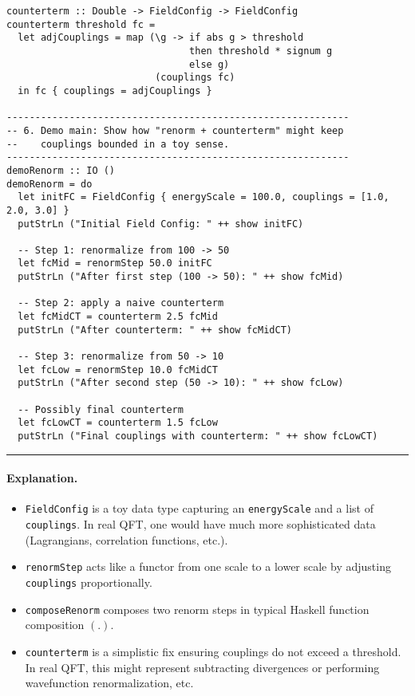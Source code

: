\documentclass[12pt]{article}
\begin{document}
\begin{verbatim}
counterterm :: Double -> FieldConfig -> FieldConfig
counterterm threshold fc =
  let adjCouplings = map (\g -> if abs g > threshold
                                then threshold * signum g
                                else g)
                          (couplings fc)
  in fc { couplings = adjCouplings }

------------------------------------------------------------
-- 6. Demo main: Show how "renorm + counterterm" might keep
--    couplings bounded in a toy sense.
------------------------------------------------------------
demoRenorm :: IO ()
demoRenorm = do
  let initFC = FieldConfig { energyScale = 100.0, couplings = [1.0, 2.0, 3.0] }
  putStrLn ("Initial Field Config: " ++ show initFC)

  -- Step 1: renormalize from 100 -> 50
  let fcMid = renormStep 50.0 initFC
  putStrLn ("After first step (100 -> 50): " ++ show fcMid)

  -- Step 2: apply a naive counterterm
  let fcMidCT = counterterm 2.5 fcMid
  putStrLn ("After counterterm: " ++ show fcMidCT)

  -- Step 3: renormalize from 50 -> 10
  let fcLow = renormStep 10.0 fcMidCT
  putStrLn ("After second step (50 -> 10): " ++ show fcLow)

  -- Possibly final counterterm
  let fcLowCT = counterterm 1.5 fcLow
  putStrLn ("Final couplings with counterterm: " ++ show fcLowCT)
\end{verbatim}
\noindent\rule{\textwidth}{0.4pt}

\paragraph{Explanation.}
\begin{itemize}
\item \texttt{FieldConfig} is a toy data type capturing an \texttt{energyScale} and a list of \texttt{couplings}. 
In real QFT, one would have much more sophisticated data (Lagrangians, correlation functions, etc.).
\item \texttt{renormStep} acts like a functor from one scale to a lower scale by adjusting \texttt{couplings} proportionally.
\item \texttt{composeRenorm} composes two renorm steps in typical Haskell function composition \((.)\).
\item \texttt{counterterm} is a simplistic fix ensuring couplings do not exceed a threshold. 
In real QFT, this might represent subtracting divergences or performing wavefunction renormalization, etc.
\end{itemize}
\end{document}
